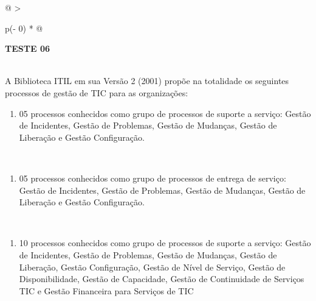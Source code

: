 \documentclass[
]{book}
\providecommand{\tightlist}{%
  \setlength{\itemsep}{0pt}\setlength{\parskip}{0pt}}
\begin{document}
\begin{longtable}[]{@{}
  >{\raggedright\arraybackslash}p{(\columnwidth - 0\tabcolsep) * }@{}}
\toprule\noalign{}
\begin{minipage}[b]{\linewidth}\raggedright
\textbf{TESTE 06}
\end{minipage} \\
\midrule\noalign{}
\endhead
\bottomrule\noalign{}
\endlastfoot
A Biblioteca ITIL em sua Versão 2 (2001) propõe na totalidade os seguintes processos de gestão de TIC para as organizações: \\
\begin{minipage}[t]{\linewidth}\raggedright
\begin{enumerate}
\def\labelenumi{\Alph{enumi})}
\tightlist
\item
  05 processos conhecidos como grupo de processos de suporte a serviço: Gestão de Incidentes, Gestão de Problemas, Gestão de Mudanças, Gestão de Liberação e Gestão Configuração.
\end{enumerate}
\end{minipage} \\
\begin{minipage}[t]{\linewidth}\raggedright
\begin{enumerate}
\def\labelenumi{\Alph{enumi})}
\setcounter{enumi}{1}
\tightlist
\item
  05 processos conhecidos como grupo de processos de entrega de serviço: Gestão de Incidentes, Gestão de Problemas, Gestão de Mudanças, Gestão de Liberação e Gestão Configuração.
\end{enumerate}
\end{minipage} \\
\begin{minipage}[t]{\linewidth}\raggedright
\begin{enumerate}
\def\labelenumi{\Alph{enumi})}
\setcounter{enumi}{2}
\tightlist
\item
  10 processos conhecidos como grupo de processos de suporte a serviço: Gestão de Incidentes, Gestão de Problemas, Gestão de Mudanças, Gestão de Liberação, Gestão Configuração, Gestão de Nível de Serviço, Gestão de Disponibilidade, Gestão de Capacidade, Gestão de Continuidade de Serviços TIC e Gestão Financeira para Serviços de TIC
\end{enumerate}
\end{minipage} \\
\begin{minipage}[t]{\linewidth}\raggedright
\begin{enumerate}

\end{enumerate}
\end{minipage}
\end{longtable}
\end{document}
